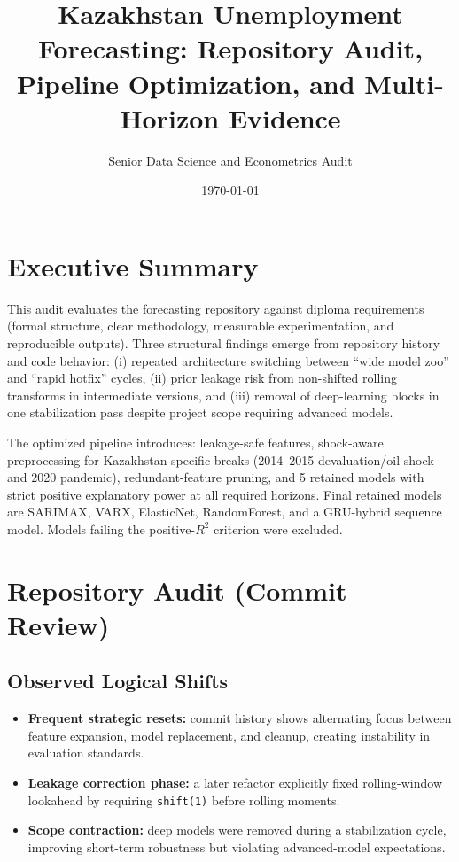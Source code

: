 \documentclass[11pt,a4paper]{article}
\title{Kazakhstan Unemployment Forecasting: Repository Audit, Pipeline Optimization, and Multi-Horizon Evidence}
\author{Senior Data Science and Econometrics Audit}
\date{\today}
\begin{document}
\maketitle

\section{Executive Summary}
This audit evaluates the forecasting repository against diploma requirements (formal structure, clear methodology, measurable experimentation, and reproducible outputs). Three structural findings emerge from repository history and code behavior: (i) repeated architecture switching between ``wide model zoo'' and ``rapid hotfix'' cycles, (ii) prior leakage risk from non-shifted rolling transforms in intermediate versions, and (iii) removal of deep-learning blocks in one stabilization pass despite project scope requiring advanced models.  

The optimized pipeline introduces: leakage-safe features, shock-aware preprocessing for Kazakhstan-specific breaks (2014--2015 devaluation/oil shock and 2020 pandemic), redundant-feature pruning, and 5 retained models with strict positive explanatory power at all required horizons. Final retained models are SARIMAX, VARX, ElasticNet, RandomForest, and a GRU-hybrid sequence model. Models failing the positive-\(R^2\) criterion were excluded.

\section{Repository Audit (Commit Review)}
\subsection{Observed Logical Shifts}
\begin{itemize}
\item \textbf{Frequent strategic resets:} commit history shows alternating focus between feature expansion, model replacement, and cleanup, creating instability in evaluation standards.
\item \textbf{Leakage correction phase:} a later refactor explicitly fixed rolling-window lookahead by requiring \texttt{shift(1)} before rolling moments.
\item \textbf{Scope contraction:} deep models were removed during a stabilization cycle, improving short-term robustness but violating advanced-model expectations.
\end{itemize}
\end{document}
